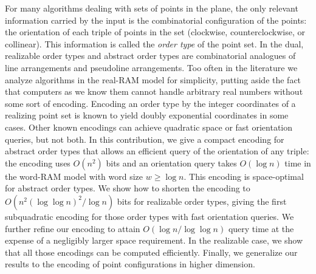 	For many algorithms dealing with sets of points in the plane, the only
	relevant information carried by the input is the combinatorial
	configuration of the points: the orientation of each triple of points in
	the set (clockwise, counterclockwise, or collinear). This information is
	called the \emph{order type} of the point set.
%
	In the dual, realizable order types and abstract order types are
	combinatorial analogues of line arrangements and pseudoline arrangements.
%
	Too often in the literature we analyze algorithms in the
	real-RAM model for simplicity, putting aside the fact that computers as we
	know them cannot handle arbitrary real numbers without some sort of
	encoding.
%
	Encoding an order type by the integer coordinates of a realizing point
	set is known to yield doubly exponential coordinates in some cases. Other
	known encodings can achieve quadratic space or fast orientation queries,
	but not both.
%
	In this contribution, we give a compact encoding for abstract order types
	that allows an efficient query of the orientation of any triple: the encoding
	uses \( O(n^2) \) bits and an orientation query takes \(O(\log n)\) time in
	the word-RAM model with word size \(w \geq \log n\).
%
	This encoding is space-optimal for abstract order types. We show how to
	shorten the encoding to \(O(n^2 {(\log\log n)}^2 / \log n)\) bits for
	realizable order types, giving the first subquadratic encoding for those
	order types with fast orientation queries.
%
	We further refine our encoding to attain \(O(\log n/\log\log n)\)
	query time at the expense of a negligibly larger space requirement.
%
	In the realizable case, we show that all those encodings can be computed
	efficiently.
%
	Finally, we generalize our results to the encoding of point configurations
	in higher dimension.
